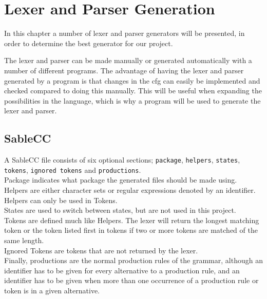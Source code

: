 \chapter{Lexer and Parser Generation}
In this chapter a number of lexer and parser generators will be presented, in order to determine the best generator for our project.

The lexer and parser can be made manually or generated automatically with a number of different programs. The advantage of having the lexer and parser generated by a program is that changes in the cfg can easily be implemented and checked compared to doing this manually. This will be useful when expanding the possibilities in the language, which is why a program will be used to generate the lexer and parser.


\section{SableCC}

A SableCC file consists of six optional sections; \texttt{package}, \texttt{helpers}, \texttt{states}, \texttt{tokens}, \texttt{ignored tokens} and \texttt{productions}.\\
Package indicates what package the generated files should be made using. \\
Helpers are either character sets or regular expressions denoted by an identifier. Helpers can only be used in Tokens. \\
States are used to switch between states, but are not used in this project. \\
Tokens are defined much like Helpers. The lexer will return the longest matching token or the token listed first in tokens if two or more tokens are matched of the same length. \\
Ignored Tokens are tokens that are not returned by the lexer. \\
Finally, productions are the normal production rules of the grammar, although an identifier has to be given for every alternative to a production rule, and an identifier has to be given when more than one occurrence of a production rule or token is in a given alternative.

